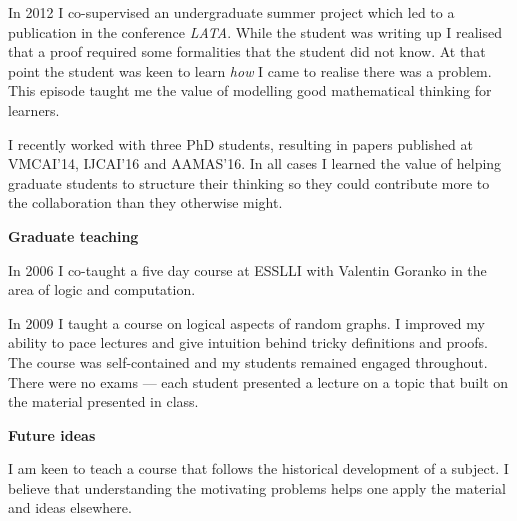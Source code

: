 \documentclass[12pt]{article}
\theoremstyle{plain} \numberwithin{equation}{section}
\theoremstyle{definition}
\begin{document}
In 2012 I co-supervised an undergraduate summer project which led to a publication in the conference {\em LATA}.  While the student was writing up I realised that a proof required some formalities that the student did not know. At that point the student was keen to learn {\em how} I came to realise there was a problem. This episode taught me the value of modelling good mathematical thinking for learners. %

I recently worked with three PhD students, resulting in papers published at VMCAI'14, IJCAI'16 and AAMAS'16. In all cases I learned the value of 
helping graduate students to structure their thinking so they could contribute more to the collaboration than they otherwise might.

{\bf Graduate teaching}

In 2006 I co-taught a five day course at ESSLLI with Valentin Goranko in the area of logic and computation. 

In 2009 I taught a course on logical aspects of random graphs. I improved my ability to pace lectures and give intuition
behind tricky definitions and proofs. The course was self-contained and my students remained engaged throughout. 
There were no exams --- each student presented a lecture on a topic that built on the material presented in class.

{\bf Future ideas}

I am keen to teach a course that follows the historical development of a subject. I believe that understanding the
motivating problems helps one apply the material and ideas elsewhere.

% 
% 
\end{document}
